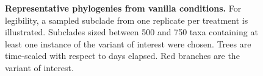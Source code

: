 \begin{figure}
\caption{%
\textbf{Representative phylogenies from vanilla conditions.}
\footnotesize
For legibility, a sampled subclade from one replicate per treatment is illustrated.
Subclades sized between 500 and 750 taxa containing at least one instance of the variant of interest were chosen.
Trees are time-scaled with respect to days elapsed.
Red branches are the variant of interest.
}
\label{fig:phylos-vanilla-example}

\end{figure}
